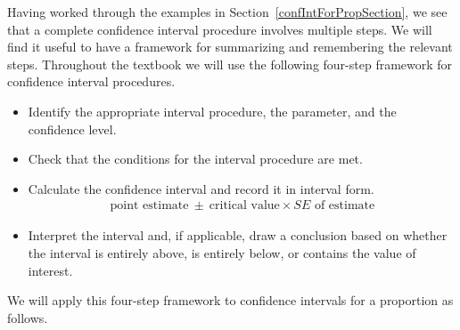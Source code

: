 Having worked through the examples in Section~\ref{confIntForPropSection}, we see that a complete confidence interval procedure involves multiple steps.  We will find it useful to have a framework for summarizing and remembering the relevant steps.  Throughout the textbook we will use the following four-step framework for confidence interval procedures.  

\begin{itemize}
\setlength{\itemsep}{0mm}
\item {}  Identify the appropriate interval procedure, the parameter, and the confidence level.
\item  {}  Check that the conditions for the interval procedure are met. 
\item {} Calculate the confidence interval and record it in interval form.  
\begin{align*}
\text{point estimate}\ \pm\  \text{critical value}\times SE \text{ of estimate}
\end{align*}
\item {} Interpret the interval and, if applicable, draw a conclusion based on whether the interval is entirely above, is entirely below, or contains the value of interest.
\end{itemize}


\noindent We will apply this four-step framework to confidence intervals for a proportion as follows.

